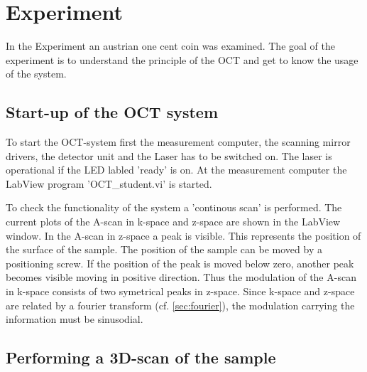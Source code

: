 \chapter{Experiment}

In the Experiment an austrian one cent coin was examined. The goal of the experiment is to understand the principle of the OCT and get to know the usage of the system.

\section{Start-up of the OCT system}

To start the OCT-system first the measurement computer, the scanning mirror drivers, the detector unit and the Laser has to be switched on. The laser is operational if the LED labled 'ready' is on. At the measurement computer the LabView program 'OCT\_student.vi' is started.

To check the functionality of the system a 'continous scan' is performed. The current plots of the A-scan in k-space and z-space are shown in the LabView window. In the A-scan in z-space a peak is visible. This represents the position of the surface of the sample. The position of the sample can be moved by a positioning screw. If the position of the peak is moved below zero, another peak becomes visible moving in positive direction. Thus the modulation of the A-scan in k-space consists of two symetrical peaks in z-space. Since k-space and z-space are related by a fourier transform (cf. \ref{sec:fourier}), the modulation carrying the information must be sinusodial. 


\section{Performing a 3D-scan of the sample}
